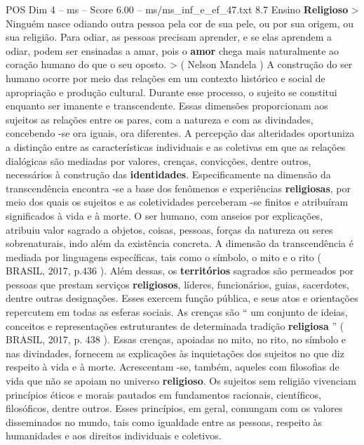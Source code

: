 \begin{textsample}{POS Dim 4 – ms – Score 6.00 – ms/ms\_inf\_e\_ef\_47.txt}  \label{ex:f4_pos_160}
8.7 Ensino \textbf{Religioso} > Ninguém nasce odiando outra pessoa pela cor de sua pele, ou por sua origem, ou sua religião.
Para odiar, as pessoas precisam aprender, e se elas aprendem a odiar, podem ser ensinadas a amar, pois o \textbf{amor} chega mais naturalmente ao coração humano do que o seu oposto. > ( Nelson Mandela ) A construção do ser humano ocorre por meio das relações em um contexto histórico e social de apropriação e produção cultural.
Durante esse processo, o sujeito se constitui enquanto ser imanente e transcendente.
Essas dimensões proporcionam aos sujeitos as relações entre os pares, com a natureza e com as divindades, concebendo -se ora iguais, ora diferentes.
A percepção das alteridades oportuniza a distinção entre as características individuais e as coletivas em que as relações dialógicas são mediadas por valores, crenças, convicções, dentre outros, necessários à construção das \textbf{identidades}.
Especificamente na dimensão da transcendência encontra -se a base dos fenômenos e experiências \textbf{religiosas}, por meio dos quais os sujeitos e as coletividades perceberam -se finitos e atribuíram significados à vida e à morte.
O ser humano, com anseios por explicações, atribuiu valor sagrado a objetos, coisas, pessoas, forças da natureza ou seres sobrenaturais, indo além da existência concreta.
A dimensão da transcendência é mediada por linguagens específicas, tais como o símbolo, o mito e o rito ( BRASIL, 2017, p.436 ).
Além dessas, os \textbf{territórios} sagrados são permeados por pessoas que prestam serviços \textbf{religiosos}, líderes, funcionários, guias, sacerdotes, dentre outras designações.
Esses exercem função pública, e seus atos e orientações repercutem em todas as esferas sociais.
As crenças são “ um conjunto de ideias, conceitos e representações estruturantes de determinada tradição \textbf{religiosa} ” ( BRASIL, 2017, p. 438 ).
Essas crenças, apoiadas no mito, no rito, no símbolo e nas divindades, fornecem as explicações às inquietações dos sujeitos no que diz respeito à vida e à morte.
Acrescentam -se, também, aqueles com filosofias de vida que não se apoiam no universo \textbf{religioso}.
Os sujeitos sem religião vivenciam princípios éticos e morais pautados em fundamentos racionais, científicos, filosóficos, dentre outros.
Esses princípios, em geral, comungam com os valores disseminados no mundo, tais como igualdade entre as pessoas, respeito às humanidades e aos direitos individuais e coletivos.

\end{textsample}
